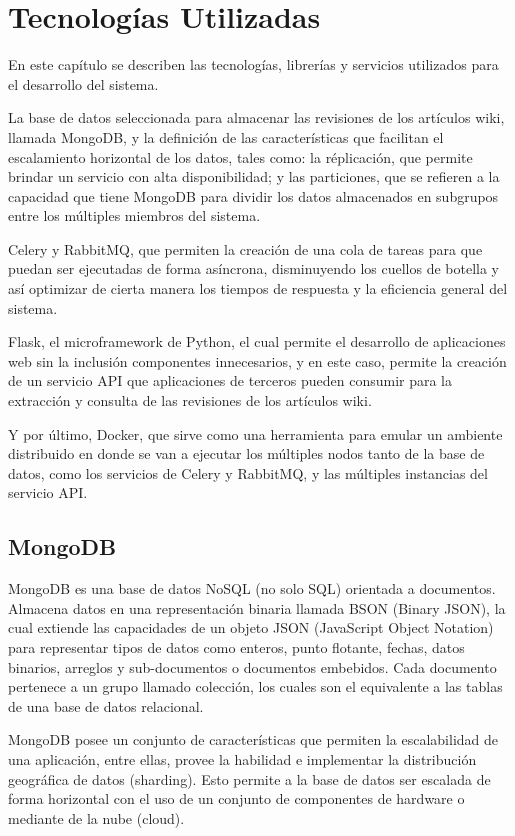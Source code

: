 \section{Tecnologías Utilizadas}

En este capítulo se describen las tecnologías, librerías y servicios utilizados para el desarrollo
del sistema.

La base de datos seleccionada para almacenar las revisiones de los artículos wiki, llamada MongoDB,
y la definición de las características que facilitan el escalamiento horizontal de los datos, tales como: la réplicación,
que permite brindar un servicio con alta disponibilidad; y las particiones, que se refieren a la capacidad
que tiene MongoDB para dividir los datos almacenados en subgrupos entre los múltiples miembros del sistema.

Celery y RabbitMQ, que permiten la creación de una cola de tareas para que puedan ser ejecutadas de forma asíncrona,
disminuyendo los cuellos de botella y así optimizar de cierta manera los tiempos de respuesta y la eficiencia
general del sistema.

Flask, el microframework de Python, el cual permite el desarrollo de aplicaciones web
sin la inclusión componentes innecesarios, y en este caso, permite la creación de un servicio API que aplicaciones
de terceros pueden consumir para la extracción y consulta de las revisiones de los artículos wiki.

Y por último, Docker, que sirve como una herramienta para emular un ambiente distribuido en donde
se van a ejecutar los múltiples nodos tanto de la base de datos, como los servicios de Celery y RabbitMQ, y
las múltiples instancias del servicio API.

\subsection{MongoDB}

MongoDB es una base de datos NoSQL (no solo SQL) orientada a documentos. Almacena
datos en una representación binaria llamada BSON (Binary JSON), la cual extiende
las capacidades de un objeto JSON (JavaScript Object Notation) para representar
tipos de datos como enteros, punto flotante, fechas, datos binarios, arreglos y sub-documentos o
documentos embebidos. Cada documento pertenece a un grupo llamado colección, los cuales son el
equivalente a las tablas de una base de datos relacional.

MongoDB posee un conjunto de  características que permiten la escalabilidad de una aplicación, entre ellas,
provee la habilidad e implementar la distribución geográfica de datos (sharding). Esto permite a la
base de datos ser escalada de forma horizontal con el uso de un conjunto de componentes de hardware o mediante
de la nube (cloud).

